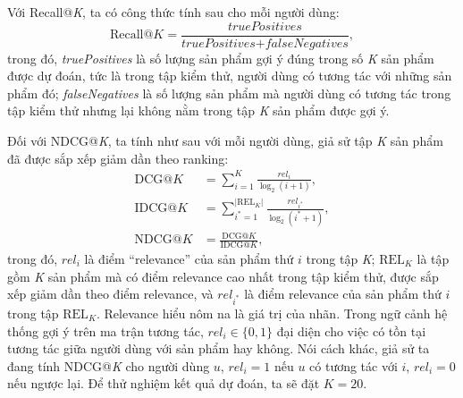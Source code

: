 Với Recall@\textit{K}, ta có công thức tính sau cho mỗi người dùng:
\begin{equation}
    \text{Recall@}K = \frac{\textit{truePositives}}{\textit{truePositives} + \textit{falseNegatives}},
\end{equation}
trong đó, \textit{truePositives} là số lượng sản phẩm gợi ý đúng trong số \textit{K} sản phẩm được dự đoán, tức là trong tập kiểm thử, người dùng có tương tác với những sản phẩm đó; \textit{falseNegatives} là số lượng sản phẩm mà người dùng có tương tác trong tập kiểm thử nhưng lại không nằm trong tập \textit{K} sản phẩm được gợi ý.

Đối với NDCG@\textit{K}, ta tính như sau với mỗi người dùng, giả sử tập \textit{K} sản phẩm đã được sắp xếp giảm dần theo ranking:
\begin{equation}
    \begin{aligned}
        \text{DCG@}K & = \sum_{i = 1}^{K}{\frac{\textit{rel}_i}{\log_2(i + 1)}}, \\
        \text{IDCG@}K & = \sum_{i^\ast = 1}^{|\text{REL}_K|}{\frac{\textit{rel}_{i^\ast}}{\log_2(i^\ast + 1)}}, \\
        \text{NDCG@}K & = \frac{\text{DCG@}K}{\text{IDCG@}K},
    \end{aligned}
\end{equation}
trong đó, $\textit{rel}_i$ là điểm ``relevance'' của sản phẩm thứ $i$ trong tập \textit{K}; $\text{REL}_K$ là tập gồm \textit{K} sản phẩm mà có điểm relevance cao nhất trong tập kiểm thử, được sắp xếp giảm dần theo điểm relevance, và $\textit{rel}_{i^\ast}$ là điểm relevance của sản phẩm thứ $i$ trong tập $\text{REL}_K$. Relevance hiểu nôm na là giá trị của nhãn. Trong ngữ cảnh hệ thống gợi ý trên ma trận tương tác, $\textit{rel}_i \in \{0, 1\}$ đại diện cho việc có tồn tại tương tác giữa người dùng với sản phẩm hay không. Nói cách khác, giả sử ta đang tính NDCG@\textit{K} cho người dùng $u$, $\textit{rel}_i = 1$ nếu $u$ có tương tác với $i$, $\textit{rel}_i = 0$ nếu ngược lại. Để thử nghiệm kết quả dự đoán, ta sẽ đặt $K = 20$.

